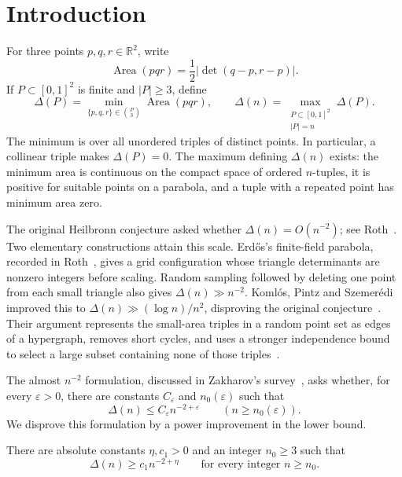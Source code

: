 \section{Introduction}\label{intro:section}

For three points $p,q,r\in\mathbb R^2$, write
\[
 \operatorname{Area}(pqr)=\frac12|\det(q-p,r-p)|.
\]
If $P\subset[0,1]^2$ is finite and $|P|\ge3$, define
\[
 \Delta(P)=\min_{\{p,q,r\}\in\binom P3}\operatorname{Area}(pqr),
 \qquad
 \Delta(n)=\max_{\substack{P\subset[0,1]^2\\|P|=n}}\Delta(P).
\]
The minimum is over all unordered triples of distinct points. In particular,
a collinear triple makes $\Delta(P)=0$.
The maximum defining $\Delta(n)$ exists: the minimum area is continuous on
the compact space of ordered $n$-tuples, it is positive for suitable points
on a parabola, and a tuple with a repeated point has minimum area zero.

The original Heilbronn conjecture asked whether $\Delta(n)=O(n^{-2})$;
see Roth~\cite[p.~198]{Roth1951}. Two elementary constructions attain this
scale. Erd\H{o}s's finite-field parabola, recorded in
Roth~\cite[Appendix]{Roth1951}, gives a grid configuration whose triangle
determinants are nonzero integers before scaling. Random sampling followed
by deleting one point from each small triangle also gives
$\Delta(n)\gg n^{-2}$. Koml\'os, Pintz and Szemer\'edi improved this to
$\Delta(n)\gg(\log n)/n^2$, disproving the original
conjecture~\cite{KPS1982}. Their argument represents the small-area triples
in a random point set as edges of a hypergraph, removes short cycles,
and uses a stronger independence bound to select a large subset containing
none of those triples~\cite[Section~2]{KPS1982}.

The almost $n^{-2}$ formulation, discussed in
Zakharov's survey~\cite[Section~3]{Zakharov2026}, asks whether, for every
$\varepsilon>0$, there are constants $C_\varepsilon$ and
$n_0(\varepsilon)$ such that
\begin{equation}\label{intro:almost}
 \Delta(n)\le C_\varepsilon n^{-2+\varepsilon}
 \qquad(n\ge n_0(\varepsilon)).
\end{equation}
We disprove this formulation by a power improvement in the lower bound.

\begin{theorem}\label{intro:main}
There are absolute constants $\eta,c_1>0$ and an integer $n_0\ge3$ such that
\[
 \Delta(n)\ge c_1n^{-2+\eta}
 \qquad\text{for every integer }n\ge n_0.
\]
\end{theorem}

